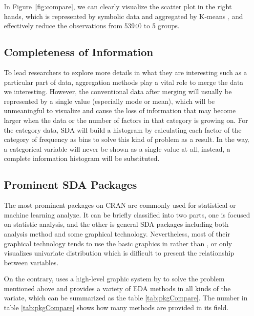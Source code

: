 \documentclass[article]{jss}
\begin{document}
In Figure~\ref{fig:compare}, we can clearly visualize the scatter plot in the right hands, which is represented by symbolic data and aggregated by K-means \cite{macqueen:1967}, and effectively reduce the observations from 53940 to 5 groups. 


\subsection{Completeness of Information}

To lead researchers to explore more details in what they are interesting such as a particular part of data, aggregation methods play a vital role to merge the data we interesting. However, the conventional data after merging will usually be represented by a single value (especially mode or mean), which will be unmeaningful to visualize and cause the loss of information that may become larger when the data or the number of factors in that category is growing on. For the category data, SDA will build a histogram by calculating each factor of the category of frequency as bins to solve this kind of problem as a result. In the way, a categorical variable will never be shown as a single value at all, instead, a complete information histogram will be substituted. 

\subsection{Prominent SDA Packages}

The most prominent packages on CRAN are commonly used for statistical or machine learning analyze. It can be briefly classified into two parts, one is focused on statistic analysis, and the other is general SDA packages including both analysis method and some graphical technology. Nevertheless, most of their graphical technology tends to use the basic graphics in  rather than , or only visualizes univariate distribution which is difficult to present the relationship between variables. 

On the contrary,  uses a high-level graphic system by  to solve the problem mentioned above and provides a variety of EDA methods in all kinds of the variate, which can be summarized as the table \ref{tab:pkgCompare}. The number in table \ref{tab:pkgCompare} shows how many methods are provided in its field.
\end{document}
